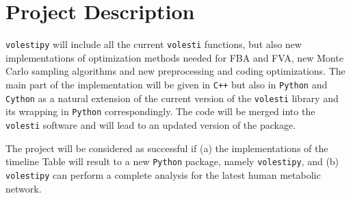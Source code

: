 \documentclass[a4paper, 12pt]{article}
\begin{document}

\section{Project Description}
\texttt{volestipy} will include all the current \texttt{volesti} functions, but also new implementations of optimization methods needed for FBA and FVA, new Monte Carlo sampling algorithms and new preprocessing and coding optimizations.
The main part of the implementation will be given in \texttt{C++} but also in \texttt{Python} and \texttt{Cython} as a natural extension of the current version of the \texttt{volesti} library and its wrapping in \texttt{Python} correspondingly. 
The code will be merged into the \texttt{volesti} software and will lead to an updated version of the package. %


The project will be considered as successful if (a) the implementations of the timeline Table will result to a new \texttt{Python} package, namely \texttt{volestipy}, and (b) \texttt{volestipy} can perform a complete analysis for the latest human metabolic network. %
\end{document}
